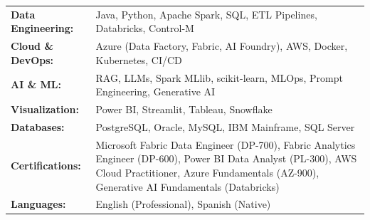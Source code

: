 \documentclass[11pt,letterpaper]{article}
\begin{document}
\begin{tabularx}{\textwidth}{@{}l X@{}}
\textbf{Data Engineering:} & Java, Python, Apache Spark, SQL, ETL Pipelines, Databricks, Control-M \\
\textbf{Cloud \& DevOps:} & Azure (Data Factory, Fabric, AI Foundry), AWS, Docker, Kubernetes, CI/CD \\
\textbf{AI \& ML:} & RAG, LLMs, Spark MLlib, scikit-learn, MLOps, Prompt Engineering, Generative AI \\
\textbf{Visualization:} & Power BI, Streamlit, Tableau, Snowflake \\
\textbf{Databases:} & PostgreSQL, Oracle, MySQL, IBM Mainframe, SQL Server \\
\textbf{Certifications:} & Microsoft Fabric Data Engineer (DP-700), Fabric Analytics Engineer (DP-600), Power BI Data Analyst (PL-300), AWS Cloud Practitioner, Azure Fundamentals (AZ-900), Generative AI Fundamentals (Databricks) \\
\textbf{Languages:} & English (Professional), Spanish (Native) \\
\end{tabularx}
\end{document}
